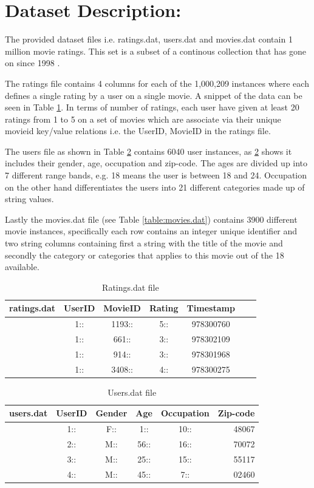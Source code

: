 \documentclass[12pt]{article}
\author{Rasmus Munk}
\date{\today}
\begin{document}
\section{Dataset Description:}
The provided dataset files \cite{Harper2015} i.e. ratings.dat, users.dat and movies.dat contain 1 million movie ratings. This set is a subset of a continous collection that has gone on since 1998 \cite{Harper2015}.

 The ratings file contains 4 columns for each of the 1,000,209 instances where each defines a single rating by a user on a single movie. A snippet of the data can be seen in Table \ref{table:ratings.dat}. In terms of number of ratings, each user have given at least 20 ratings from 1 to 5 on a set of movies which are associate via their unique movieid key/value relations i.e. the UserID, MovieID in the ratings file.
 
 The users file as shown in Table \ref{table:users.dat} contains 6040 user instances, as \ref{table:users.dat} shows it includes their gender, age, occupation and zip-code. The ages are divided up into 7 different range bands, e.g. 18 means the user is between 18 and 24. Occupation on the other hand differentiates the users into 21 different categories made up of string values.
 
  Lastly the movies.dat file (see Table \ref{table:movies.dat}) contains 3900 different movie instances, specifically each row contains an integer unique identifier and two string columns containing first a string with the title of the movie and secondly the category or categories that applies to this movie out of the 18 available.

\begin{table}[H]
	\caption{Ratings.dat file}
	\label{table:ratings.dat}
	\centering
	\begin{tabular}{l*{5}{c}r}
		ratings.dat	& UserID & MovieID & Rating & Timestamp \\
		\hline
		&	1:: & 1193:: & 5:: & 978300760 \\
		&	1:: & 661:: & 3:: & 978302109 \\
		&	1:: & 914:: & 3:: & 978301968 \\
		&	1:: & 3408:: & 4:: & 978300275 \\
	\end{tabular}
\end{table}

\begin{table}[H]
	\caption{Users.dat file}
	\label{table:users.dat}
	\centering
	\begin{tabular}{l*{4}{c}r}
		users.dat & UserID & Gender & Age & Occupation & Zip-code \\
		\hline
		& 1:: & F:: & 1:: & 10:: & 48067 \\
		& 2:: & M:: & 56:: & 16:: & 70072 \\
		& 3:: & M:: & 25:: & 15:: & 55117 \\
		& 4:: & M:: & 45:: & 7:: & 02460 \\
	\end{tabular}
\end{table}
\end{document}
